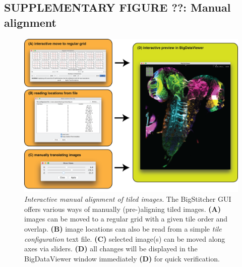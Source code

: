 \documentclass[]{spie}  %
\begin{document}
\subsection*{SUPPLEMENTARY FIGURE ??: Manual alignment}
\vspace{1mm}
\begin{figure}[h!]
\includegraphics[width=\textwidth]{manual-view-arrangement.png}
\vspace{-2.0mm}
\caption{\hspace{-0.5mm} \emph{Interactive manual alignment of tiled images.} The BigStitcher GUI offers various ways of manually (pre-)aligning tiled images. \textbf{(A)} images can be moved to a regular grid with a given tile order and overlap. \textbf{(B)} image locations can also be read from a simple \emph{tile configuration} text file. \textbf{(C)} selected image(s) can be moved along axes via sliders. \textbf{(D)} all changes will be displayed in the BigDataViewer window immediately \textbf{(D)} for quick verification. 
}
\label{fig:sup-fig-manual-align1}
\end{figure}

\pagebreak
\end{document}

